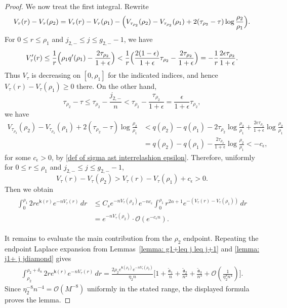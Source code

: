 \documentclass[a4paper]{article}
\numberwithin{equation}{section}
\begin{document}
\begin{proof}
We now treat the first integral. Rewrite
\[
V_{\tau}(r)-V_{\tau}(\rho_2)
=
V_{\tau}(r)-V_{\tau}(\rho_1)
-\Bigl( 
V_{\tau_{\rho_2}}(\rho_{2})-V_{\tau_{\rho_2}}(\rho_1)+2(\tau_{\rho_2}-\tau)\log\frac{\rho_2}{\rho_1}
\Bigr). 
\]
For $0\leq r\leq \rho_1$ and $j_{2,-}\leq j\leq g_{2,-}-1$, we have 
\begin{align*}
V_{\tau}'(r)\leq \frac{1}{r}\Bigl(\rho_1q'(\rho_1)-\frac{2\tau_{\rho_2}}{1+\epsilon}\Bigr)
<\frac{1}{r}\Bigl(\frac{2(1-\epsilon)}{1+\epsilon}\tau_{\rho_2}-\frac{2\tau_{\rho_2}}{1+\epsilon}\Bigr)
=-\frac{1}{r}\frac{2\epsilon\tau_{\rho_2}}{1+\epsilon}.
\end{align*}
Thus $V_\tau$ is decreasing on $[0,\rho_1]$ for the indicated indices, and hence $V_\tau(r)-V_\tau(\rho_1)\geq0$ there. On the other hand,
\[
\tau_{\rho_2}-\tau\leq \tau_{\rho_2}-\frac{j_{2,-}}{n}<\tau_{\rho_2}-\frac{\tau_{\rho_2}}{1+\epsilon}
=\frac{\epsilon}{1+\epsilon}\tau_{\rho_2},
\]
we have
\begin{align*}
V_{\tau_{\rho_2}}(\rho_{2})-V_{\tau_{\rho_2}}(\rho_1)+2(\tau_{\rho_2}-\tau)\log\frac{\rho_2}{\rho_1}
&<q(\rho_2)-q(\rho_1)
-2\tau_{\rho_2}\log\frac{\rho_2}{\rho_1}+\frac{2\epsilon\tau_{\rho_2}}{1+\epsilon}\log\frac{\rho_2}{\rho_1}
\\
&=q(\rho_2)-q(\rho_1)-\frac{2\tau_{\rho_2}}{1+\epsilon}\log\frac{\rho_2}{\rho_1}<-c_{\epsilon},
\end{align*}
for some $c_\epsilon>0$, by \eqref{def of sigma ast interrelashion epsilon}. Therefore, uniformly for $0\leq r\leq\rho_1$ and $j_{2,-}\leq j\leq g_{2,-}-1$,
\[
V_{\tau}(r)-V_{\tau}(\rho_2)>V_{\tau}(r)-V_{\tau}(\rho_1)+c_{\epsilon}>0. 
\]
Then we obtain 
\begin{align}
    \begin{split}
\int_0^{\rho_1}2re^{\mathsf{k}(r)}e^{-nV_{\tau}(r)}\,dr
&\leq C_s e^{-nV_{\tau}(\rho_2)}e^{-nc_{\epsilon}}\int_{0}^{\rho_1}r^{2\alpha+1}e^{-(V_{\tau}(r)-V_{\tau}(\rho_1))} \,dr
\\
&=e^{-nV_{\tau}(\rho_2)}\cdot\mathcal{O}(e^{-c_{\epsilon}n}). 
    \end{split}
\end{align}

It remains to evaluate the main contribution from the $\rho_2$ endpoint. Repeating the endpoint Laplace expansion from Lemmas~\ref{lemma: g1+leq j leq j+1} and \ref{lemma: j1+ j jdiamond} gives
\begin{align*}
\int_{\rho_2}^{\rho_2+\delta_n}2re^{\mathsf{k}(r)}e^{-nV_{\tau}(r)}\,dr
=
\frac{2\rho_2e^{\mathsf{k}(\rho_2)}e^{-nV_{\tau}(\rho_2)}}{\eta_2 n}
\bigg[1+\frac{\widetilde{\mathfrak{a}}_1}{n}+\frac{\widetilde{\mathfrak{a}}_2}{n^2}+\frac{\widetilde{\mathfrak{a}}_3}{n^3}+\mathcal{O}(\frac{1}{\eta_2^8n^4})\bigg]. 
\end{align*}
Since $\eta_2^{-8}n^{-4}=\mathcal O(M^{-8})$ uniformly in the stated range, the displayed formula proves the lemma.

\end{proof}
\end{document}
